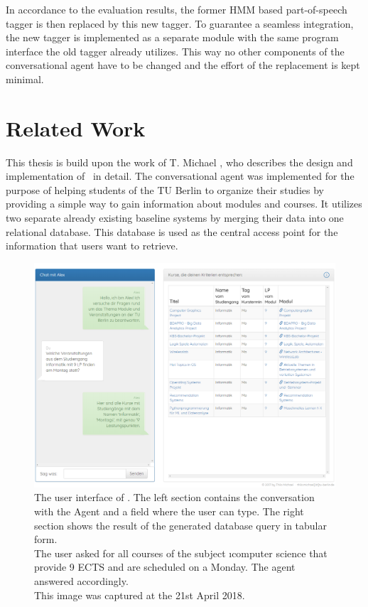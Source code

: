 In accordance to the evaluation results, the former HMM based part-of-speech tagger is then replaced by this new tagger. To guarantee a seamless integration, the new tagger is implemented as a separate module with the same program interface the old tagger already utilizes. This way no other components of the conversational agent have to be changed and the effort of the replacement is kept minimal.

\section{Related Work}\label{c.introduction.related}
This thesis is build upon the work of T. Michael \cite{michael2016}, who describes the design and implementation of \Alex\ in detail. The conversational agent was implemented for the purpose of helping students of the TU Berlin to organize their studies by providing a simple way to gain information about modules and courses. It utilizes two separate already existing baseline systems by merging their data into one relational database. This database is  used as the central access point for the information that users want to retrieve.

\begin{figure}[H]
	\includegraphics[width=\textwidth]{images/alex_screencapture}
	\caption[User Interface of \Alex]{The user interface of \Alex. The left section contains the conversation with the Agent and a field where the user can type. The right section shows the result of the generated database query in tabular form.\\The user asked for all courses of the subject \i{computer science} that provide 9 ECTS and are scheduled on a Monday. The agent answered accordingly.\\This image was captured at the 21st April 2018.}
	\label{f.alex_ui}
\end{figure}

